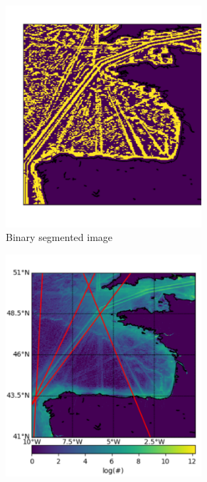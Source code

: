 \documentclass{article}
\begin{document}
\begin{figure}[ht]
\begin{subfigure}[b]{0.5\linewidth}
    \includegraphics[width=0.8\textwidth]{CELTICopened-crop.pdf} 
    \caption{Binary segmented image} 
    \label{fig7:b} 
    \vspace{4ex}
  \end{subfigure} 
  \begin{subfigure}[b]{0.5\linewidth}
    \centering
    \includegraphics[width=0.8\textwidth]{CELTIClines-crop.pdf} 

\end{subfigure}
\end{figure}
\end{document}
